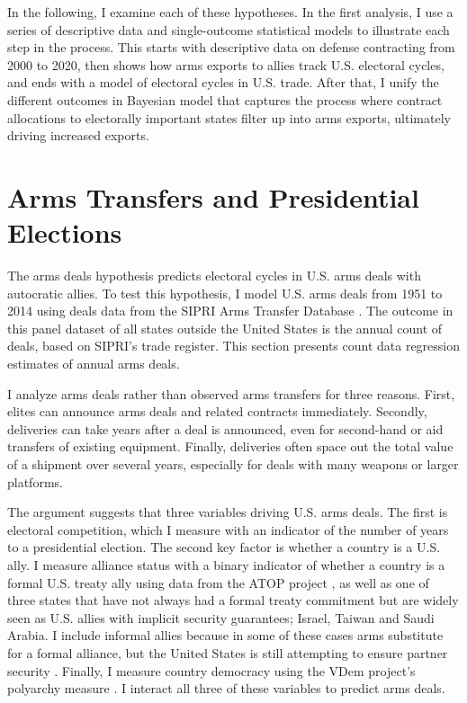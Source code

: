 \documentclass[12pt]{article}
\begin{document}
In the following, I examine each of these hypotheses. 
In the first analysis, I use a series of descriptive data and single-outcome statistical models to illustrate each step in the process.
This starts with descriptive data on defense contracting from 2000 to 2020, then shows how arms exports to allies track U.S. electoral cycles, and ends with a model of electoral cycles in U.S. trade. 
After that, I unify the different outcomes in Bayesian model that captures the process where contract allocations to electorally important states filter up into arms exports, ultimately driving increased exports.



\section{Arms Transfers and Presidential Elections}


The arms deals hypothesis predicts electoral cycles in U.S. arms deals with autocratic allies.
To test this hypothesis, I model U.S. arms deals from 1951 to 2014 using deals data from the SIPRI Arms Transfer Database \citep{SIPRI2021}.
The outcome in this panel dataset of all states outside the United States is the annual count of deals, based on SIPRI's trade register. 
This section presents count data regression estimates of annual arms deals. 


I analyze arms deals rather than observed arms transfers for three reasons.
First, elites can announce arms deals and related contracts immediately. 
Secondly, deliveries can take years after a deal is announced, even for second-hand or aid transfers of existing equipment. 
Finally, deliveries often space out the total value of a shipment over several years, especially for deals with many weapons or larger platforms. 


The argument suggests that three variables driving U.S. arms deals. 
The first is electoral competition, which I measure with an indicator of the number of years to a presidential election. 
The second key factor is whether a country is a U.S. ally. 
I measure alliance status with a binary indicator of whether a country is a formal U.S. treaty ally using data from the ATOP project \citep{Leedsetal2002}, as well as one of three states that have not always had a formal treaty commitment but are widely seen as U.S. allies with implicit security guarantees; Israel, Taiwan and Saudi Arabia. 
I include informal allies because in some of these cases arms substitute for a formal alliance, but the United States is still attempting to ensure partner security \citep{Yarhi-Miloetal2016}. 
Finally, I measure country democracy using the VDem project's polyarchy measure \citep{Coppedgeetal2008}. 
I interact all three of these variables to predict arms deals. 
\end{document}
